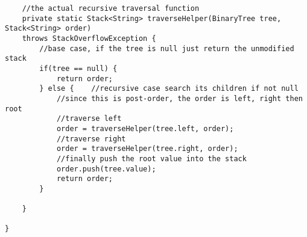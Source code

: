 \documentclass[../../../../../main.tex]{subfiles}
\begin{document}
\begin{verbatim}
	//the actual recursive traversal function
	private static Stack<String> traverseHelper(BinaryTree tree, Stack<String> order)
	throws StackOverflowException {
		//base case, if the tree is null just return the unmodified stack
		if(tree == null) {
			return order;
		} else {	//recursive case search its children if not null
			//since this is post-order, the order is left, right then root
			//traverse left
			order = traverseHelper(tree.left, order);
			//traverse right
			order = traverseHelper(tree.right, order);
			//finally push the root value into the stack
			order.push(tree.value);
			return order;
		}
		
	}
	
}
\end{verbatim}
\newpage
\noindent
\end{document}
